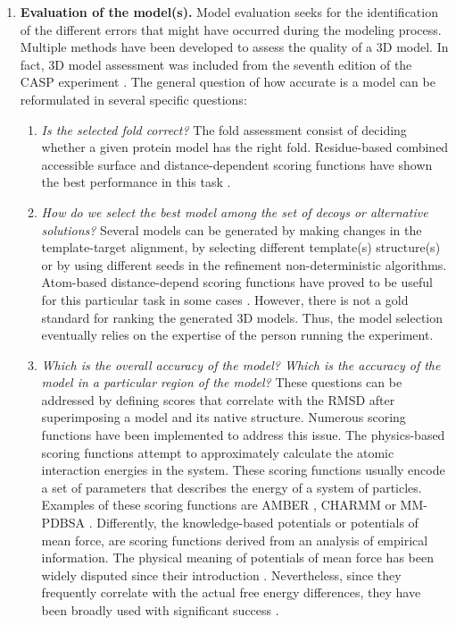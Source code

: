 \documentclass[11pt, b5paper,twoside]{tesi_upf}
\begin{document}
\begin{enumerate}
\item \textbf{Evaluation of the model(s).} Model evaluation seeks for the identification of the different errors that might have occurred during the modeling process. Multiple methods have been developed to assess the quality of a 3D model. In fact, 3D model assessment was included from the seventh edition of the CASP experiment \cite{PROT21669}. The general question of how accurate is a model can be reformulated in several specific questions: 



\begin{enumerate}[label=\roman*]
\item \textit{Is the selected fold correct?} The fold assessment consist of deciding whether a given protein model has the right fold. Residue-based combined accessible surface and distance-dependent scoring functions have shown the best performance in this task \cite{Melo2002}. 
\item \textit{How do we select the best model among the set of decoys or alternative solutions?} Several models can be generated by making changes in the template-target alignment, by selecting different template(s) structure(s) or by using different seeds in the refinement non-deterministic algorithms. Atom-based distance-depend scoring functions have proved to be useful for this particular task in some cases \cite{Samudrala1998}. However, there is not a gold standard for ranking the generated 3D models. Thus, the model selection eventually relies on the expertise of the person running the experiment. 
\item \textit{Which is the overall accuracy of the model? Which is the accuracy of the model in a particular region of the model?} These questions can be addressed by defining scores that correlate with the RMSD after superimposing a model and its native structure. Numerous scoring functions have been implemented to address this issue. The physics-based scoring functions attempt  to  approximately  calculate the  atomic  interaction  energies  in  the  system. These scoring functions usually encode a set of parameters that describes the energy of a system of particles. Examples of these scoring functions are AMBER \cite{CASE2005}, CHARMM \cite{Brooks1983} or MM-PDBSA \cite{Fogolari2003}. Differently, the knowledge-based potentials or potentials of mean force, are scoring functions derived from an analysis of empirical information. The physical meaning of potentials of mean force has been widely disputed since their introduction \cite{Thomas1996}. Nevertheless, since they frequently correlate with the actual free energy differences, they have been broadly used with significant success \cite{Shen2006, Zhou2002, Sippl1995}. 
\end{enumerate}
\end{enumerate}
\end{document}
